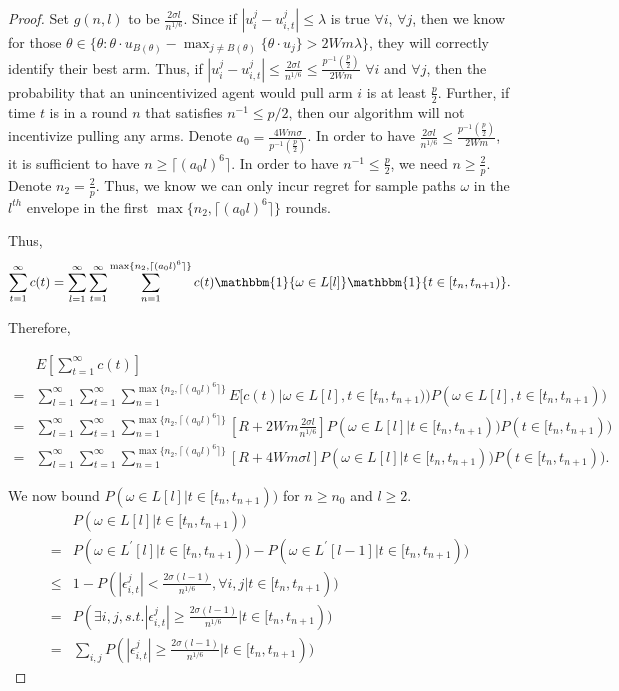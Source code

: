 \documentclass{article}
\begin{document}
\begin{proof}
Set $g(n,l)$ to be $\frac{2\sigma l}{n^{1/6}}$. Since if $|u_{i}^{j}-u_{i,t}^{j}|\leq \lambda$ is true $\forall i$, $\forall j$, then we know for those $\theta\in \{\theta:\theta\cdot u_{B(\theta)}-\max_{j\neq B(\theta)}\{\theta \cdot u_{j}\}> 2Wm\lambda\}$, they will correctly identify their best arm. Thus, if $|u_{i}^{j}-u_{i,t}^{j}|\leq \frac{2\sigma l}{n^{1/6}} \leq \frac{p^{-1}(\frac{p}{2})}{2Wm}$ $\forall i$ and $\forall j$, then the probability that an unincentivized agent would pull arm $i$ is at least $\frac{p}{2}$. Further, if time $t$ is in a round $n$ that satisfies $n^{-1}\leq p/2$, then our algorithm will not incentivize pulling any arms. Denote $a_0=\frac{4Wm\sigma}{p^{-1}(\frac{p}{2})}$. In order to have $\frac{2\sigma l}{n^{1/6}}\leq \frac{p^{-1}(\frac{p}{2})}{2Wm}$, it is sufficient to have $n\geq \lceil (a_{0} l)^6 \rceil$. In order to have $n^{-1}\leq \frac{p}{2}$, we need $n\geq \frac{2}{p}$. Denote $n_2=\frac{2}{p}$. Thus, we know we can only incur regret for sample paths $\omega$ in the $l^{th}$ envelope in the first $\max\{n_2,\lceil (a_0 l)^6 \rceil\}$ rounds.

Thus,
\begin{align}
\sum_{t=1}^{\infty}c(t)=\sum_{l=1}^{\infty}\sum_{t=1}^{\infty}\sum_{n=1}^{\max\{n_2,\lceil (a_0 l)^6 \rceil\}}c(t)\mathbbm{1}\{\omega\in L[l]\}\mathbbm{1}\{t\in [t_n,t_{n+1})\}. \nonumber
\end{align}

Therefore,

\begin{align}
&E\left[\sum_{t=1}^{\infty}c(t)\right] \nonumber\\
=&\sum_{l=1}^{\infty}\sum_{t=1}^{\infty}\sum_{n=1}^{\max\{n_2,\lceil (a_0 l)^6 \rceil\}}E[c(t)|\omega \in L[l],t\in [t_n,t_{n+1}))P(\omega\in L[l],t\in [t_n,t_{n+1})) \nonumber \\
=&\sum_{l=1}^{\infty}\sum_{t=1}^{\infty}\sum_{n=1}^{\max\{n_2,\lceil (a_0 l)^6 \rceil\}}\left[R+2Wm\frac{2\sigma l}{n^{1/6}}\right]P(\omega\in L[l]|t\in [t_n,t_{n+1}))P(t\in [t_n,t_{n+1})) \nonumber \\
=&\sum_{l=1}^{\infty}\sum_{t=1}^{\infty}\sum_{n=1}^{\max\{n_2,\lceil (a_0 l)^6 \rceil\}}\left[R+4Wm\sigma l\right]P(\omega\in L[l]|t\in [t_n,t_{n+1}))P(t\in [t_n,t_{n+1})). \nonumber
\end{align}

We now bound $P(\omega\in L[l]|t\in[t_{n},t_{n+1}))$ for $n\geq n_0$ and $l\geq 2$.
\begin{align}
&P(\omega\in L[l]|t\in[t_{n},t_{n+1})) \nonumber \\
=&P(\omega\in L^{'}[l]|t\in[t_{n},t_{n+1}))- P(\omega\in L^{'}[l-1]|t\in[t_{n},t_{n+1})) \nonumber \\
\leq & 1-P(|\epsilon_{i,t}^{j}|<\frac{2\sigma (l-1)}{n^{1/6}}, \forall i,j|t\in[t_n,t_{n+1})) \nonumber \\
=&P(\exists i,j, s.t. |\epsilon_{i,t}^{j}|\geq \frac{2\sigma (l-1)}{n^{1/6}}|t\in[t_n,t_{n+1})) \nonumber  \\
=&\sum_{i,j}P(|\epsilon_{i,t}^{j}|\geq \frac{2\sigma (l-1)}{n^{1/6}}|t\in[t_n,t_{n+1})) \nonumber
\end{align}


\end{proof}
\end{document}
